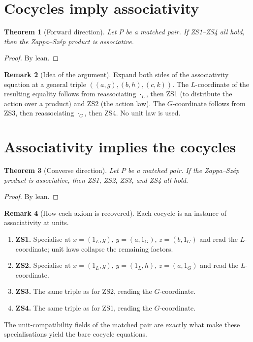 \documentclass[11pt,a4paper]{article}
\theoremstyle{plain}
\newtheorem{theorem}{Theorem}[section]
\theoremstyle{definition}
\newtheorem{remark}[theorem]{Remark}
\begin{document}
\section{Cocycles imply associativity}

\begin{theorem}[Forward direction]\label{thm:assoc-of-zs}
Let $P$ be a matched pair. If ZS1--ZS4 all hold, then the Zappa--Sz\'{e}p
product is associative.
\end{theorem}

\begin{proof}
By lean.
\end{proof}

\begin{remark}[Idea of the argument]
Expand both sides of the associativity equation at a general triple
$((a,g),(b,h),(c,k))$. The $L$-coordinate of the resulting equality follows
from reassociating $\cdot_L$, then ZS1 (to distribute the action over a
product) and ZS2 (the action law). The $G$-coordinate follows from ZS3, then
reassociating $\cdot_G$, then ZS4. No unit law is used.
\end{remark}

\section{Associativity implies the cocycles}

\begin{theorem}[Converse direction]\label{thm:zs-of-assoc}
Let $P$ be a matched pair. If the Zappa--Sz\'{e}p product is associative, then
ZS1, ZS2, ZS3, and ZS4 all hold.
\end{theorem}

\begin{proof}
By lean.
\end{proof}

\begin{remark}[How each axiom is recovered]
Each cocycle is an instance of associativity at units.
\begin{enumerate}
  \item \textbf{ZS1.} Specialise at
        $x = (1_L, g)$, $y = (a, 1_G)$, $z = (b, 1_G)$ and read the
        $L$-coordinate; unit laws collapse the remaining factors.
  \item \textbf{ZS2.} Specialise at
        $x = (1_L, g)$, $y = (1_L, h)$, $z = (a, 1_G)$ and read the
        $L$-coordinate.
  \item \textbf{ZS3.} The same triple as for ZS2, reading the $G$-coordinate.
  \item \textbf{ZS4.} The same triple as for ZS1, reading the $G$-coordinate.
\end{enumerate}
The unit-compatibility fields of the matched pair are exactly what make these
specialisations yield the bare cocycle equations.
\end{remark}
\end{document}

